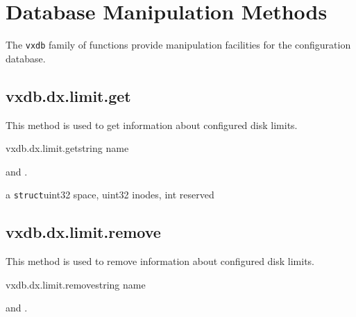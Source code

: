 \chapter{Database Manipulation Methods}

The \texttt{vxdb} family of functions provide manipulation facilities for the
configuration database.


\section{vxdb.dx.limit.get}

This method is used to get information about configured disk limits.

\begin{rpcsynopsis}{vxdb.dx.limit.get}{string name}
\end{rpcsynopsis}

\begin{rpcaccess}
 and \rpcownerchecks.
\end{rpcaccess}

\begin{rpcreturncomplex}{a \texttt{struct}}{uint32 space, uint32 inodes,
	int reserved}
\end{rpcreturncomplex}

\rpcnoerrors


\section{vxdb.dx.limit.remove}

This method is used to remove information about configured disk limits.

\begin{rpcsynopsis}{vxdb.dx.limit.remove}{string name}
\end{rpcsynopsis}

\begin{rpcaccess}
 and \rpcownerchecks.
\end{rpcaccess}

\rpcreturnnil

\rpcnoerrors


